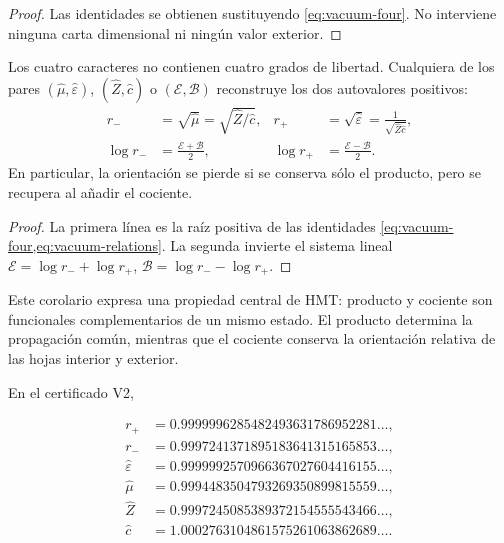 \begin{proof}
Las identidades se obtienen sustituyendo \cref{eq:vacuum-four}. No interviene ninguna carta dimensional ni ning\'un valor exterior.
\end{proof}

\begin{corollary}
Los cuatro caracteres no contienen cuatro grados de libertad. Cualquiera de
los pares \((\widehat\mu,\widehat\varepsilon)\),
\((\widehat Z,\widehat c)\) o \((\mathcal E,\mathcal B)\) reconstruye los
dos autovalores positivos:
\begin{align}
r_-&=\sqrt{\widehat\mu}
=\sqrt{\widehat Z/\widehat c},
&r_+&=\sqrt{\widehat\varepsilon}
=\frac1{\sqrt{\widehat Z\widehat c}},
\label{eq:vacuum-reconstruct-r}\\
\log r_-&=\frac{\mathcal E+\mathcal B}{2},
&\log r_+&=\frac{\mathcal E-\mathcal B}{2}.
\label{eq:vacuum-reconstruct-log}
\end{align}
En particular, la orientaci\'on se pierde si se conserva s\'olo el producto,
pero se recupera al a\~nadir el cociente.
\end{corollary}

\begin{proof}
La primera l\'inea es la ra\'iz positiva de las identidades
\cref{eq:vacuum-four,eq:vacuum-relations}. La segunda invierte el sistema
lineal
\(\mathcal E=\log r_-+\log r_+\),
\(\mathcal B=\log r_--\log r_+\).
\end{proof}

Este corolario expresa una propiedad central de HMT: producto y cociente son
funcionales complementarios de un mismo estado. El producto determina la
propagaci\'on com\'un, mientras que el cociente conserva la orientaci\'on
relativa de las hojas interior y exterior.

En el certificado V2,

\begin{align*}
r_+&=0.9999996285482493631786952281\ldots,\\
r_-&=0.9997241371895183641315165853\ldots,\\
\widehat\varepsilon&=0.9999992570966367027604416155\ldots,\\
\widehat\mu&=0.9994483504793269350899815559\ldots,\\
\widehat Z&=0.9997245085389372154555543466\ldots,\\
\widehat c&=1.0002763104861575261063862689\ldots.
\end{align*}

